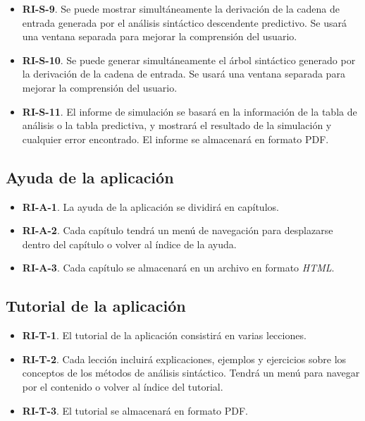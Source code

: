 \begin{itemize}
    
    \item \textbf{RI-S-9}. Se puede mostrar simultáneamente la derivación de la cadena de entrada generada por el análisis sintáctico descendente predictivo. Se usará una ventana separada para mejorar la comprensión del usuario.
    
    \item \textbf{RI-S-10}. Se puede generar simultáneamente el árbol sintáctico generado por la derivación de la cadena de entrada. Se usará una ventana separada para mejorar la comprensión del usuario.
    
    \item \textbf{RI-S-11}. El informe de simulación se basará en la información de la tabla de análisis o la tabla predictiva, y mostrará el resultado de la simulación y cualquier error encontrado. El informe se almacenará en formato PDF.
\end{itemize}

\subsection{Ayuda de la aplicación}

\begin{itemize}
    \item \textbf{RI-A-1}. La ayuda de la aplicación se dividirá en capítulos.
    \item \textbf{RI-A-2}. Cada capítulo tendrá un menú de navegación para desplazarse dentro del capítulo o volver al índice de la ayuda.
    \item \textbf{RI-A-3}. Cada capítulo se almacenará en un archivo en formato \textit{HTML}.
\end{itemize}

\subsection{Tutorial de la aplicación}

\begin{itemize}
    \item \textbf{RI-T-1}. El tutorial de la aplicación consistirá en varias lecciones.
    \item \textbf{RI-T-2}. Cada lección incluirá explicaciones, ejemplos y ejercicios sobre los conceptos de los métodos de análisis sintáctico. Tendrá un menú para navegar por el contenido o volver al índice del tutorial.
    \item \textbf{RI-T-3}. El tutorial se almacenará en formato PDF.
\end{itemize}

